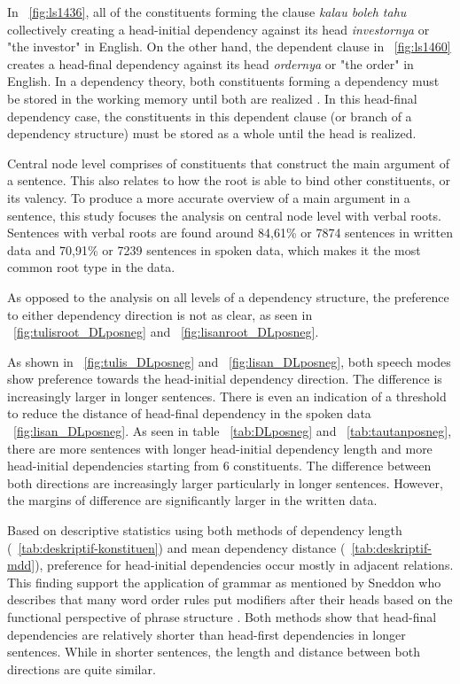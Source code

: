 \documentclass[10pt, a4paper, conference, compsocconf]{IEEEtran}
\begin{document}
In \pic~\ref{fig:ls1436}, all of the constituents forming the clause \textit{kalau boleh tahu} collectively creating a head-initial dependency against its head \textit{investornya} or "the investor" in English. On the other hand, the dependent clause in \pic~\ref{fig:ls1460} creates a head-final dependency against its head \textit{ordernya} or "the order" in English. In a dependency theory, both constituents forming a dependency must be stored in the working memory until both are realized \cite{tesniere1959elements}. In this head-final dependency case, the constituents in this dependent clause (or branch of a dependency structure) must be stored as a whole until the head is realized. 

Central node level comprises of constituents that construct the main argument of a sentence. This also relates to how the root is able to bind other constituents, or its valency. To produce a more accurate overview of a main argument in a sentence, this study focuses the analysis on central node level with verbal roots. Sentences with verbal roots are found around 84,61\% or 7874 sentences in written data and 70,91\% or 7239 sentences in spoken data, which makes it the most common root type in the data.

As opposed to the analysis on all levels of a dependency structure, the preference to either dependency direction is not as clear, as seen in \pic~\ref{fig:tulisroot_DLposneg} and \pic~\ref{fig:lisanroot_DLposneg}. 


As shown in \pic~\ref{fig:tulis_DLposneg} and \pic~\ref{fig:lisan_DLposneg}, both speech modes show preference towards the head-initial dependency direction. The difference is increasingly larger in longer sentences. There is even an indication of a threshold to reduce the distance of head-final dependency in the spoken data \pic~\ref{fig:lisan_DLposneg}. As seen in table \tab~\ref{tab:DLposneg} and \tab~\ref{tab:tautanposneg}, there are more sentences with longer head-initial dependency length and more head-initial dependencies starting from 6 constituents. The difference between both directions are increasingly larger particularly in longer sentences. However, the margins of difference are significantly larger in the written data. 

Based on descriptive statistics using both methods of dependency length (\tab~\ref{tab:deskriptif-konstituen}) and mean dependency distance (\tab~\ref{tab:deskriptif-mdd}), preference for head-initial dependencies occur mostly in adjacent relations. This finding support the application of grammar as mentioned by Sneddon who describes that many word order rules put modifiers after their heads based on the functional perspective of phrase structure \cite{sneddon2010indonesian}.  Both methods show that head-final dependencies are relatively shorter than head-first dependencies in longer sentences. While in shorter sentences, the length and distance between both directions are quite similar.
\end{document}
